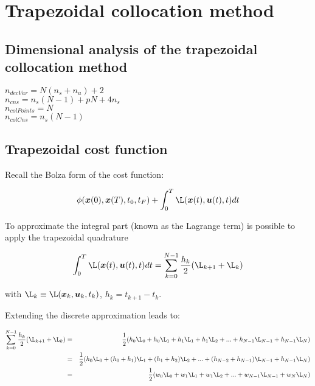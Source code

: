 \documentclass[12pt]{article}
\begin{document}
\section{Trapezoidal collocation method}

\subsection{Dimensional analysis of the trapezoidal collocation method}

\begin{center}
$n_{decVar}=N(n_s+n_u)+2$\\
\vspace{1.5mm}
$n_{cns}=n_s(N-1)+pN+4n_s$\\
\vspace{1.5mm}
$n_{colPoints}=N$\\
\vspace{1.5mm}
$n_{colCns}=n_s(N-1)$
\end{center}

\subsection{Trapezoidal cost function}

Recall the Bolza form of the cost function:

\begin{equation}
     \phi(\bm{x}(0),\bm{x}(T),t_0,t_F)+\int_{0}^{T} \L(\bm{x}(t),\bm{u}(t),t) dt
\end{equation}

\noindent To approximate the integral part (known as the Lagrange term) is possible to apply the trapezoidal quadrature

\begin{equation}\label{eq:trap_quad}
    \int_{0}^{T} \L(\bm{x}(t),\bm{u}(t),t) dt =\sum_{k=0}^{N-1}\frac{h_k}{2}(\L_{k+1}+\L_{k})
\end{equation}

\noindent with $\L_k\equiv \L(\bm{x}_{k},\bm{u}_{k},t_{k})$, $h_k=t_{k+1}-t_k$.

\newpage
\noindent Extending the discrete approximation leads to:

\begin{eqnarray*}
  \sum_{k=0}^{N-1}\frac{h_k}{2}(\L_{k+1}+\L_{k}) &=& \frac{1}{2}(h_0\L_0+h_0\L_1+h_1\L_1+h_1\L_2+...+h_{N-1}\L_{N-1}+h_{N-1}\L_{N})\\
   &=& \frac{1}{2}(h_0\L_0+(h_0+h_1)\L_1+(h_1+h_2)\L_2+...+(h_{N-2}+h_{N-1})\L_{N-1}+h_{N-1}\L_{N})\\
   &=& \frac{1}{2}(w_0\L_0+w_1\L_1+w_1\L_2+...+w_{N-1}\L_{N-1}+w_{N}\L_{N})
\end{eqnarray*}
\end{document}

